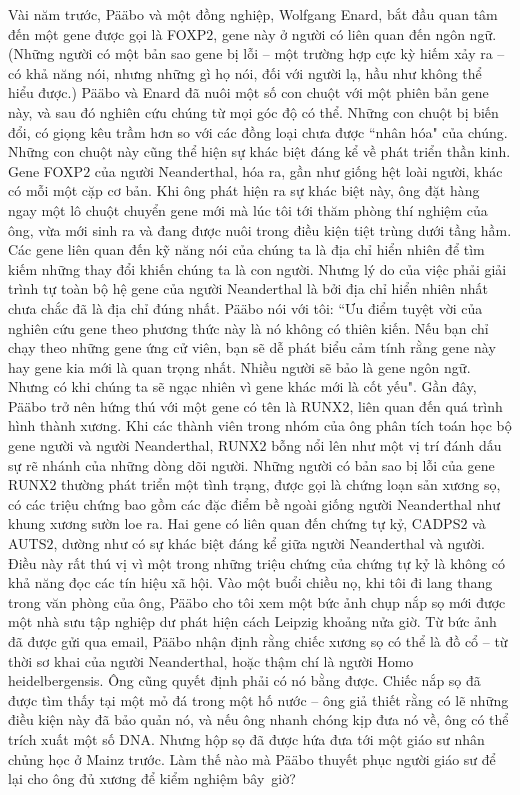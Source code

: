 \begin{multicols}{2}
	\vskip 0.1cm
	Vài năm trước, Pääbo và một đồng nghiệp, Wolfgang Enard, bắt đầu quan tâm đến một gene được gọi là FOXP$2$, gene này ở người có liên quan đến ngôn ngữ. (Những người có một bản sao gene bị lỗi -- một trường hợp cực kỳ hiếm xảy ra -- có khả năng nói, nhưng những gì họ nói, đối với người lạ, hầu như không thể hiểu được.) Pääbo và Enard đã nuôi một số con chuột với một phiên bản gene này, và sau đó nghiên cứu chúng từ mọi góc độ có thể. Những con chuột bị biến đổi, có giọng kêu trầm hơn so với các đồng loại chưa được ``nhân hóa" của chúng. Những con chuột này cũng thể hiện sự khác biệt đáng kể về phát triển thần kinh. Gene FOXP$2$ của người Neanderthal, hóa ra, gần như giống hệt loài người, khác có mỗi một cặp cơ bản. Khi ông phát hiện ra sự khác biệt này, ông đặt hàng ngay một lô chuột chuyển gene mới mà lúc tôi tới thăm phòng thí nghiệm của ông, vừa mới sinh ra và đang được nuôi trong điều kiện tiệt trùng dưới tầng hầm.
	\vskip 0.1cm
	Các gene liên quan đến kỹ năng nói của chúng ta là địa chỉ hiển nhiên để tìm kiếm những thay đổi khiến chúng ta là con người. Nhưng lý do của việc phải giải trình tự toàn bộ hệ gene của người Neanderthal là bởi địa chỉ hiển nhiên nhất chưa chắc đã là địa chỉ đúng nhất.
	\vskip 0.1cm
	Pääbo nói với tôi: ``Ưu điểm tuyệt vời của nghiên cứu gene theo phương thức này là nó không có thiên kiến. Nếu bạn chỉ chạy theo những gene ứng cử viên, bạn sẽ dễ phát biểu cảm tính rằng gene này hay gene kia mới là quan trọng nhất. Nhiều người sẽ bảo là gene ngôn ngữ. Nhưng có khi chúng ta sẽ ngạc nhiên vì gene khác mới là cốt yếu". Gần đây, Pääbo trở nên hứng thú với một gene có tên là RUNX$2$, liên quan đến quá trình hình thành xương. Khi các thành viên trong nhóm của ông phân tích toán học bộ gene người và người Neanderthal, RUNX$2$ bỗng nổi lên như một vị trí đánh dấu sự rẽ nhánh của những dòng dõi người.
	\vskip 0.1cm
	Những người có bản sao bị lỗi của gene RUNX$2$ thường phát triển một tình trạng, được gọi là chứng loạn sản xương sọ, có các triệu chứng bao gồm các đặc điểm bề ngoài giống người Neanderthal như khung xương sườn loe ra. Hai gene có liên quan đến chứng tự kỷ, CADPS$2$ và AUTS$2$, dường như có sự khác biệt đáng kể giữa người Neanderthal và người. Điều này rất thú vị vì một trong những triệu chứng của chứng tự kỷ là không có khả năng đọc các tín hiệu xã hội.
	\vskip 0.1cm
	Vào một buổi chiều nọ, khi tôi đi lang thang trong văn phòng của ông, Pääbo cho tôi xem một bức ảnh chụp nắp sọ mới được một nhà sưu tập nghiệp dư phát hiện cách Leipzig khoảng nửa giờ. Từ bức ảnh đã được gửi qua email, Pääbo nhận định rằng chiếc xương sọ có thể là đồ cổ -- từ thời sơ khai của người Neanderthal, hoặc thậm chí là người Homo heidelbergensis. Ông cũng quyết định phải có nó bằng được. Chiếc nắp sọ đã được tìm thấy tại một mỏ đá trong một hố nước -- ông giả thiết rằng có lẽ những điều kiện này đã bảo quản nó, và nếu ông nhanh chóng kịp đưa nó về, ông có thể trích xuất một số DNA. Nhưng hộp sọ đã được hứa đưa tới một giáo sư nhân chủng học ở Mainz trước. Làm thế nào mà Pääbo thuyết phục người giáo sư để lại cho ông đủ xương để kiểm nghiệm bây~giờ?

\end{multicols}
